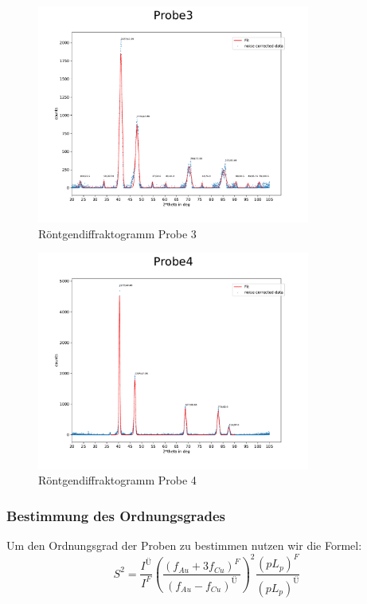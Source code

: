             \begin{figure}[H]
                \centering
                \includegraphics[width=0.8\textwidth]{Messdaten/Auswertungsskripte/Probe3.pdf}
                \caption{Röntgendiffraktogramm Probe 3}
                \label{Röntgendiffraktogramm Probe 3}
            \end{figure}
            \begin{figure}[H]
                \centering
                \includegraphics[width=0.8\textwidth]{Messdaten/Auswertungsskripte/Probe4.pdf}
                \caption{Röntgendiffraktogramm Probe 4}
                \label{Röntgendiffraktogramm Probe 4}
            \end{figure}


            \subsubsection{Bestimmung des Ordnungsgrades}
                Um den Ordnungsgrad der Proben zu bestimmen nutzen wir die Formel:
                \begin{equation}
                    S^2 = \frac{I^{\text{Ü}}}{I^F}(\frac{(f_{Au}+3f_{Cu})^F}{(f_{Au}-f_{Cu})^{\text{Ü}}})^2 \frac{(pL_p)^F}{(pL_p)^\text{Ü}}
                \end{equation}

